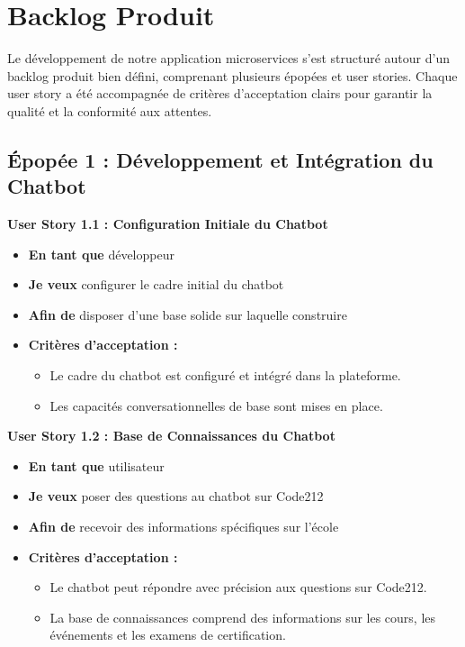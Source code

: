 \documentclass[a4paper, 11pt, openany]{report}
\begin{document}
\section{Backlog Produit}

Le développement de notre application microservices s'est structuré autour d'un backlog produit bien défini, comprenant plusieurs épopées et user stories. Chaque user story a été accompagnée de critères d'acceptation clairs pour garantir la qualité et la conformité aux attentes.

\subsection{Épopée 1 : Développement et Intégration du Chatbot}

\textbf{User Story 1.1 : Configuration Initiale du Chatbot}
\begin{itemize}
    \item \textbf{En tant que} développeur
    \item \textbf{Je veux} configurer le cadre initial du chatbot
    \item \textbf{Afin de} disposer d'une base solide sur laquelle construire
    \item \textbf{Critères d'acceptation :}
    \begin{itemize}
        \item Le cadre du chatbot est configuré et intégré dans la plateforme.
        \item Les capacités conversationnelles de base sont mises en place.
    \end{itemize}
\end{itemize}

\textbf{User Story 1.2 : Base de Connaissances du Chatbot}
\begin{itemize}
    \item \textbf{En tant que} utilisateur
    \item \textbf{Je veux} poser des questions au chatbot sur Code212
    \item \textbf{Afin de} recevoir des informations spécifiques sur l'école
    \item \textbf{Critères d'acceptation :}
    \begin{itemize}
        \item Le chatbot peut répondre avec précision aux questions sur Code212.
        \item La base de connaissances comprend des informations sur les cours, les événements et les examens de certification.
    \end{itemize}
\end{itemize}
\end{document}
